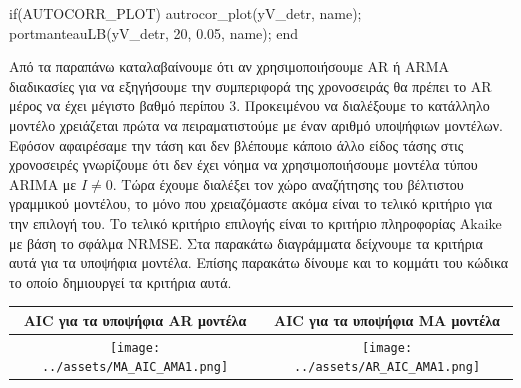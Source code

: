 \documentclass[11pt,]{article}
\newenvironment{Shaded}{}{}
\newcommand{\CommentTok}[1]{\textcolor[rgb]{0.38,0.63,0.69}{\textit{#1}}}
\newcommand{\FloatTok}[1]{\textcolor[rgb]{0.25,0.63,0.44}{#1}}
\newcommand{\NormalTok}[1]{#1}
\newcommand{\StringTok}[1]{\textcolor[rgb]{0.25,0.44,0.63}{#1}}
\begin{document}
\begin{Shaded}
\begin{Highlighting}[]
\NormalTok{if(AUTOCORR_PLOT)}
\NormalTok{  autrocor_plot(yV_detr, name);}
\NormalTok{  portmanteauLB(yV_detr, }\FloatTok{20}\NormalTok{, }\FloatTok{0.05}\NormalTok{, name);}
\NormalTok{end}
\end{Highlighting}
\end{Shaded}

\begin{Shaded}
\end{Shaded}

Από τα παραπάνω καταλαβαίνουμε ότι αν χρησιμοποιήσουμε AR ή ARMA
διαδικασίες για να εξηγήσουμε την συμπεριφορά της χρονοσειράς θα πρέπει
το AR μέρος να έχει μέγιστο βαθμό περίπου 3. Προκειμένου να διαλέξουμε
το κατάλληλο μοντέλο χρειάζεται πρώτα να πειραματιστούμε με έναν αριθμό
υποψήφιων μοντέλων. Εφόσον αφαιρέσαμε την τάση και δεν βλέπουμε κάποιο
άλλο είδος τάσης στις χρονοσειρές γνωρίζουμε ότι δεν έχει νόημα να
χρησιμοποιήσουμε μοντέλα τύπου ARIMA με \(I \neq 0\). Τώρα έχουμε
διαλέξει τον χώρο αναζήτησης του βέλτιστου γραμμικού μοντέλου, το μόνο
που χρειαζόμαστε ακόμα είναι το τελικό κριτήριο για την επιλογή του. Το
τελικό κριτήριο επιλογής είναι το κριτήριο πληροφορίας Akaike με βάση το
σφάλμα NRMSE. Στα παρακάτω διαγράμματα δείχνουμε τα κριτήρια αυτά για τα
υποψήφια μοντέλα. Επίσης παρακάτω δίνουμε και το κομμάτι του κώδικα το
οποίο δημιουργεί τα κριτήρια αυτά.

\begin{longtable}[]{@{}cc@{}}
\toprule
AIC για τα υποψήφια AR μοντέλα & AIC για τα υποψήφια MA
μοντέλα\tabularnewline
\midrule
\endhead
\texttt{[image: ../assets/MA\_AIC\_AMA1.png]}
&
\texttt{[image: ../assets/AR\_AIC\_AMA1.png]}\tabularnewline
\bottomrule
\end{longtable}
\end{document}
